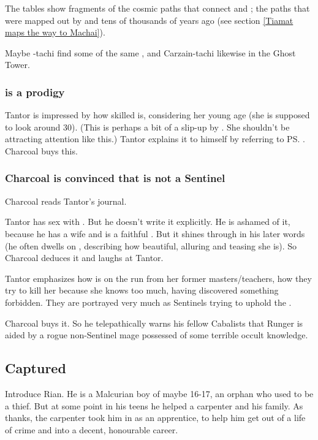 \begin{garbage}
The tables show fragments of the cosmic paths that connect \Miith{} and \Machai; the paths that were mapped out by \Tiamat{} and \ApepNesthra{} tens of thousands of years ago (see section \ref{Tiamat maps the way to Machai}). 

Maybe \Shilred-tachi find some of the same , and Carzain-tachi likewise in the Ghost Tower. 





\subsubsection{\Takestsha{} is a prodigy}
Tantor is impressed by how skilled \Takestsha{} is, considering her young age (she is supposed to look around 30). (This is perhaps a bit of a slip-up by \Nzessuacrith. She shouldn't be attracting attention like this.) 
Tantor explains it to himself by referring to \ps{\Takestsha} . Charcoal buys this. 





\subsubsection{Charcoal is convinced that \Takestsha{} is not a Sentinel}
Charcoal reads Tantor's journal. 

Tantor has sex with \Takestsha. But he doesn't write it explicitly. He is ashamed of it, because he has a wife and is a faithful \Iquinian. But it shines through in his later words (he often dwells on \Takestsha, describing how beautiful, alluring and teasing she is). So Charcoal deduces it and laughs at Tantor. 

Tantor emphasizes how \Takestsha{} is on the run from her former masters/teachers, how they try to kill her because she knows too much, having discovered something forbidden. They are portrayed very much as Sentinels trying to uphold the \charade. 

Charcoal buys it. So he telepathically warns his fellow Cabalists that Runger is aided by a rogue non-Sentinel mage possessed of some terrible occult knowledge. 









\subsection{Captured}
Introduce Rian. He is a Malcurian boy of maybe 16-17, an orphan who used to be a thief. But at some point in his teens he helped a carpenter and his family. As thanks, the carpenter took him in as an apprentice, to help him get out of a life of crime and into a decent, honourable career. 


\end{garbage}
